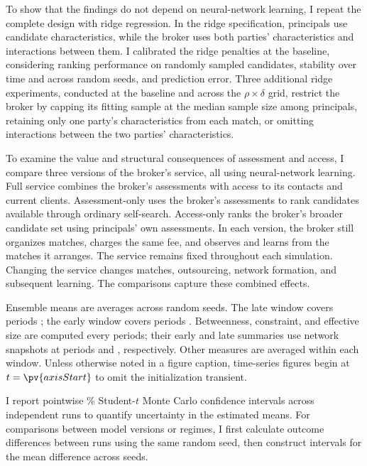 To show that the findings do not depend on neural-network learning, I repeat the complete design with ridge regression. In the ridge specification, principals use candidate characteristics, while the broker uses both parties' characteristics and interactions between them. I calibrated the ridge penalties at the baseline, considering ranking performance on randomly sampled candidates, stability over time and across random seeds, and prediction error. Three additional ridge experiments, conducted at the baseline and across the $\rho\times\delta$ grid, restrict the broker by capping its fitting sample at the median sample size among principals, retaining only one party's characteristics from each match, or omitting interactions between the two parties' characteristics.

To examine the value and structural consequences of assessment and access, I compare three versions of the broker's service, all using neural-network learning. Full service combines the broker's assessments with access to its contacts and current clients. Assessment-only uses the broker's assessments to rank candidates available through ordinary self-search. Access-only ranks the broker's broader candidate set using principals' own assessments. In each version, the broker still organizes matches, charges the same fee, and observes and learns from the matches it arranges. The service remains fixed throughout each simulation. Changing the service changes matches, outsourcing, network formation, and subsequent learning. The comparisons capture these combined effects.

Ensemble means are averages across random seeds. The late window covers periods ; the early window covers periods . Betweenness, constraint, and effective size are computed every  periods; their early and late summaries use network snapshots at periods  and , respectively. Other measures are averaged within each window. Unless otherwise noted in a figure caption, time-series figures begin at $t=\pv{axisStart}$ to omit the initialization transient.

I report pointwise \% Student-$t$ Monte Carlo confidence intervals across independent runs to quantify uncertainty in the estimated means. For comparisons between model versions or regimes, I first calculate outcome differences between runs using the same random seed, then construct intervals for the mean difference across seeds.

